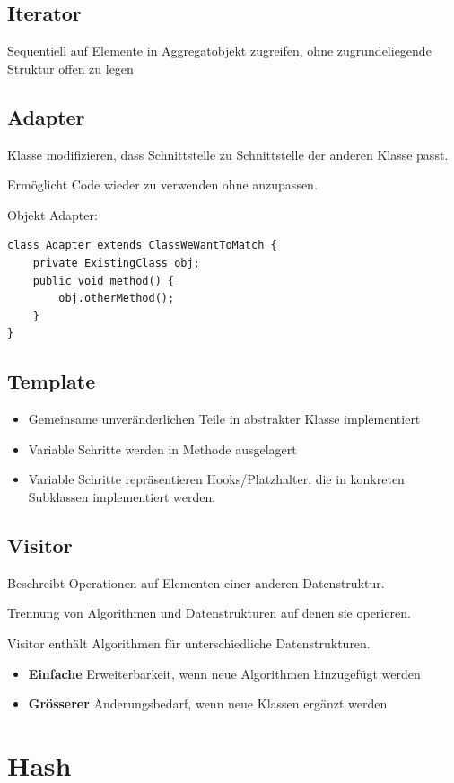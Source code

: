 \begin{multicols*}{4}
	\subsection{Iterator}
	Sequentiell auf Elemente in Aggregatobjekt zugreifen, ohne zugrundeliegende Struktur offen zu legen
	
	\subsection{Adapter}
	Klasse modifizieren, dass Schnittstelle zu Schnittstelle der anderen Klasse passt.
	
	Ermöglicht Code wieder zu verwenden ohne anzupassen.
	
	Objekt Adapter:
	\begin{lstlisting}
class Adapter extends ClassWeWantToMatch {
	private ExistingClass obj;
	public void method() {
		obj.otherMethod();
	}
}
	\end{lstlisting}

	\subsection{Template}
	\begin{itemize}
		\item Gemeinsame unveränderlichen Teile in abstrakter Klasse implementiert
		\item Variable Schritte werden in Methode ausgelagert
		\item Variable Schritte repräsentieren Hooks/Platzhalter, die in konkreten Subklassen implementiert werden.
	\end{itemize}

	\subsection{Visitor}
	Beschreibt Operationen auf Elementen einer anderen Datenstruktur.
	
	Trennung von Algorithmen und Datenstrukturen auf denen sie operieren. 
	
	Visitor enthält Algorithmen für unterschiedliche Datenstrukturen.
	\begin{itemize}
		\item \textbf{Einfache} Erweiterbarkeit, wenn neue Algorithmen hinzugefügt werden
		\item \textbf{Grösserer} Änderungsbedarf, wenn neue Klassen ergänzt werden
	\end{itemize}

\section{Hash}


\end{multicols*}
